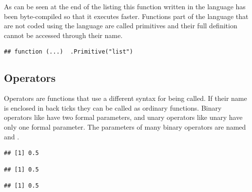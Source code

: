 \documentclass[krantz2]{krantz}\usepackage{knitr}%
\begin{document}
As can be seen at the end of the listing this function written in the \Rlang language has been byte-compiled so that it executes faster. Functions part of the \Rlang language that are not coded using the \Rlang language are called primitives and their full definition cannot be accessed through their name.

\begin{knitrout}\footnotesize
{}\color{fgcolor}\begin{kframe}
\begin{alltt}
\end{alltt}
\begin{verbatim}
## function (...)  .Primitive("list")
\end{verbatim}
\end{kframe}
\end{knitrout}

\subsection{Operators}

Operators are functions that use a different syntax for being called. If their name is enclosed in back ticks they can be called as ordinary functions. Binary operators like \code{+} have two formal parameters, and unary operators like unary \code{-} have only one formal parameter. The parameters of many binary \Rlang operators are named  and .

\begin{knitrout}\footnotesize
{}\color{fgcolor}\begin{kframe}
\begin{alltt}
 \hlopt{/} 
\end{alltt}
\begin{verbatim}
## [1] 0.5
\end{verbatim}
\begin{alltt}
\hlstd{(} \hlstd{,} \hlstd{)}
\end{alltt}
\begin{verbatim}
## [1] 0.5
\end{verbatim}
\begin{alltt}
\hlstd{(} \hlstd{=}  \hlstd{,}  \hlstd{=} \hlstd{)}
\end{alltt}
\begin{verbatim}
## [1] 0.5
\end{verbatim}
\end{kframe}
\end{knitrout}
\end{document}
